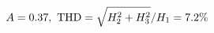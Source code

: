 \documentclass[preview]{standalone}
\begin{document}
\begin{align*}
\special{dvisvgm:raw <g id='unique000'>}A=0.37,\ \text{THD}=\sqrt{H_2^2+H_3^2}/H_1=7.2\%\special{dvisvgm:raw </g>}
\end{align*}
\end{document}
